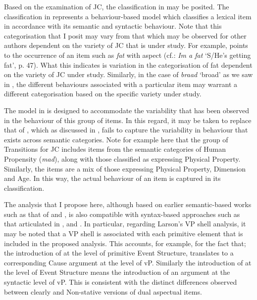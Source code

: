 Based on the examination of JC, the classification in  may be posited. The classification in  represents a behaviour-based model which classifies a lexical item in accordance with its semantic and syntactic behaviour. Note that this categorisation that I posit may vary from that which may be observed for other authors dependent on the variety of JC that is under study. For example, \citet{Bailey1966} points to the occurrence of an item such as \textit{fat} with  aspect (cf.: \textit{Im a fat} `S\slash He’s getting fat', p. 47). What this indicates is variation in the categorisation of fat dependent on the variety of JC under study. Similarly, in the case of \textit{braad} `broad' as we saw in , the different behaviours associated with a particular item may warrant a different categorisation based on the specific variety under study. 

The model in  is designed to accommodate the variability that has been observed in the behaviour of this group of items. In this regard, it may be taken to replace that of \citet{Winford1993}, which as discussed in , fails to capture the variability in behaviour that exists across semantic categories. Note for example here that the group of Transitions for JC includes items from the semantic categories of Human Propensity (\textit{mad}), along with those classified as expressing Physical Property. Similarly, the  items are a mix of those expressing Physical Property, Dimension and Age. In this way, the actual behaviour of an item is captured in its classification. 

The analysis that I propose here, although based on earlier semantic-based works such as that of \citet{Carter1976,McCawley1968,Dowty1979,Pustejovsky1988,Pustejovsky1991} and \citet{Grimshaw1990}, is also compatible with syntax-based approach\-es such as that articulated in \citet{Larson1988}, and \citet{Travis2010}. In particular, regarding Larson’s VP shell analysis, it may be noted that a VP shell is associated with each primitive element that is included in the proposed analysis. This accounts, for example, for the fact that; the introduction of \CAUSE at the level of primitive Event Structure, translates to a corresponding Cause argument at the level of vP. Similarly the introduction of \DO at the level of Event Structure means the introduction of an  argument at the syntactic level of vP. This is consistent with the distinct differences observed between clearly  and Non-stative versions of dual aspectual items. 

